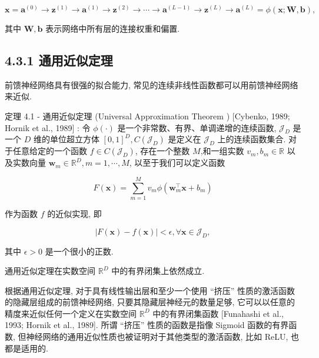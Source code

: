 \documentclass[10pt]{article}
\begin{document}
\begin{equation*}
\boldsymbol{x}=\boldsymbol{a}^{(0)} \rightarrow \boldsymbol{z}^{(1)} \rightarrow \boldsymbol{a}^{(1)} \rightarrow \boldsymbol{z}^{(2)} \rightarrow \cdots \rightarrow \boldsymbol{a}^{(L-1)} \rightarrow \boldsymbol{z}^{(L)} \rightarrow \boldsymbol{a}^{(L)}=\phi(\boldsymbol{x} ; \boldsymbol{W}, \boldsymbol{b}), \tag{4.36}
\end{equation*}


其中 $\boldsymbol{W}, \boldsymbol{b}$ 表示网络中所有层的连接权重和偏置.

\subsection*{4.3.1 通用近似定理}
前馈神经网络具有很强的拟合能力, 常见的连续非线性函数都可以用前馈神经网络来近似.

定理 4.1 - 通用近似定理 (Universal Approximation Theorem ) [Cybenko, 1989; Hornik et al., 1989] : 令 $\phi(\cdot)$ 是一个非常数、有界、单调递增的连续函数, $\mathcal{J}_{D}$ 是一个 $D$ 维的单位超立方体 $[0,1]^{D}, C\left(\mathcal{J}_{D}\right)$ 是定义在 $\mathcal{J}_{D}$ 上的连续函数集合. 对于任意给定的一个函数 $f \in C\left(\mathcal{J}_{D}\right)$, 存在一个整数 $M$,和一组实数 $v_{m}, b_{m} \in \mathbb{R}$ 以及实数向量 $\boldsymbol{w}_{m} \in \mathbb{R}^{D}, m=1, \cdots, M$, 以至于我们可以定义函数


\begin{equation*}
F(\boldsymbol{x})=\sum_{m=1}^{M} v_{m} \phi\left(\boldsymbol{w}_{m}^{\top} \boldsymbol{x}+b_{m}\right) \tag{4.37}
\end{equation*}


作为函数 $f$ 的近似实现, 即


\begin{equation*}
|F(\boldsymbol{x})-f(\boldsymbol{x})|<\epsilon, \forall \boldsymbol{x} \in \mathcal{J}_{D}, \tag{4.38}
\end{equation*}


其中 $\epsilon>0$ 是一个很小的正数.

通用近似定理在实数空间 $\mathbb{R}^{D}$ 中的有界闭集上依然成立.

根据通用近似定理, 对于具有线性输出层和至少一个使用 “挤压” 性质的激活函数的隐藏层组成的前馈神经网络, 只要其隐藏层神经元的数量足够, 它可以以任意的精度来近似任何一个定义在实数空间 $\mathbb{R}^{D}$ 中的有界闭集函数 [Funahashi et al., 1993; Hornik et al., 1989]. 所谓 “挤压” 性质的函数是指像 Sigmoid 函数的有界函数, 但神经网络的通用近似性质也被证明对于其他类型的激活函数, 比如 ReLU, 也都是适用的.
\end{document}

